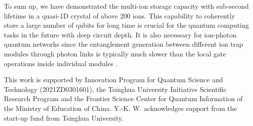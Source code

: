 \documentclass[aps,prl,reprint,superscriptaddress,twocolumn,longbibliography]{revtex4-1}
\begin{document}
To sum up, we have demonstrated the multi-ion storage capacity with sub-second lifetime in a quasi-1D crystal of above 200 ions. This capability to coherently store a large number of qubits for long time is crucial for the quantum computing tasks in the future with deep circuit depth. It is also necessary for ion-photon quantum networks since the entanglement generation between different ion trap modules through photon links is typically much slower than the local gate operations inside individual modules \cite{hucul2015modular}.

\begin{acknowledgments}
  This work is supported by Innovation Program for Quantum Science and Technology (2021ZD0301601), the Tsinghua University Initiative Scientific Research Program and the Frontier Science Center for Quantum Information of the Ministry of Education of China. Y.-K. W. acknowledges support from the start-up fund from Tsinghua University.
\end{acknowledgments}
\end{document}
